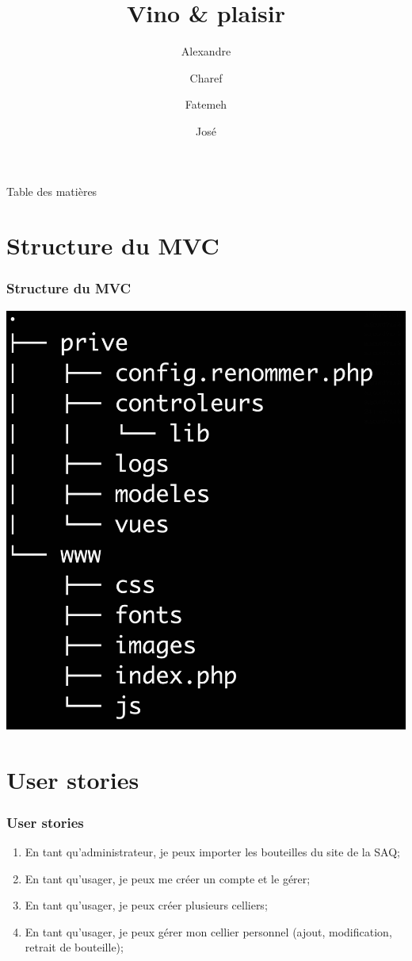 \documentclass{beamer}
\title{Vino \& plaisir}
\author{Alexandre \and Charef \and Fatemeh \and José }
\begin{document}
 
\frame{\titlepage}

\begin{frame}{Table des matières}
\tableofcontents
\end{frame}


\section{Structure du MVC}
\begin{frame}
\frametitle{Structure du MVC}
\includegraphics[width=.8\textheight]{tree}
\end{frame}


\section{User stories}
\begin{frame}
\frametitle{User stories}
\begin{enumerate}
	\item En tant qu’administrateur, je peux importer les bouteilles du site de la SAQ;
	\item En tant qu’usager, je peux me créer un compte et le gérer;
	\item En tant qu’usager, je peux créer plusieurs celliers;
	\item En tant qu’usager, je peux gérer mon cellier personnel (ajout, modification, retrait de bouteille);
\end{enumerate}
\end{frame}
\end{document}
